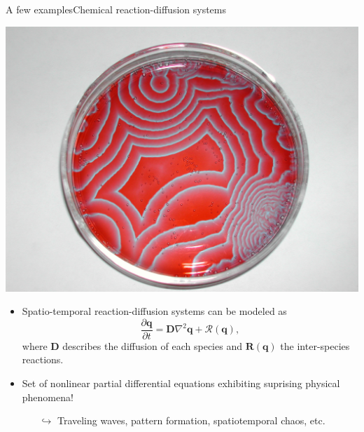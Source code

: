 \documentclass[usenames,dvipsnames,svgnames,10pt,aspectratio=169]{beamer}
\begin{document}
\begin{frame}[t, c]{A few examples}{Chemical reaction-diffusion systems}
	\begin{minipage}{.38\textwidth}
		\centering
		\includegraphics[width=\textwidth]{BZ_reaction}
	\end{minipage}%
	\hfill
	\begin{minipage}{.58\textwidth}
		\begin{itemize}
			\item Spatio-temporal reaction-diffusion systems can be modeled as
			\[
				\frac{\partial \bm{q}}{\partial t} = \bm{D} \nabla^2 \bm{q} + \mathcal{R}(\bm{q}),
			\]
			where \(\bm{D}\) describes the diffusion of each species and \( \bm{R}(\bm{q}) \) the inter-species reactions.

			\bigskip

			\item Set of nonlinear partial differential equations exhibiting suprising physical phenomena!
			\begin{itemize}
				\item[\( \hookrightarrow \)] Traveling waves, pattern formation, spatiotemporal chaos, etc.
			\end{itemize}
		\end{itemize}
	\end{minipage}

	\vspace{1cm}
\end{frame}
\end{document}
